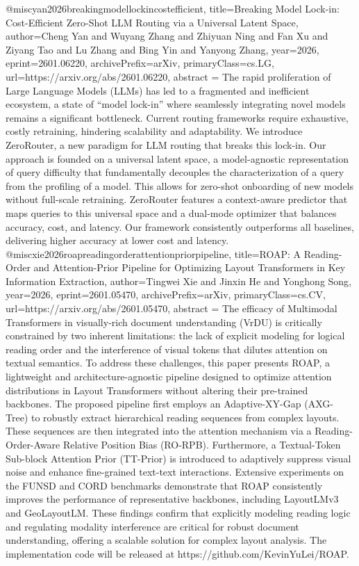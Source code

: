{}@misc{yan2026breakingmodellockincostefficient,
      title={Breaking Model Lock-in: Cost-Efficient Zero-Shot LLM Routing via a Universal Latent Space}, 
      author={Cheng Yan and Wuyang Zhang and Zhiyuan Ning and Fan Xu and Ziyang Tao and Lu Zhang and Bing Yin and Yanyong Zhang},
      year={2026},
      eprint={2601.06220},
      archivePrefix={arXiv},
      primaryClass={cs.LG},
      url={https://arxiv.org/abs/2601.06220},
      abstract = {The rapid proliferation of Large Language Models (LLMs) has led to a fragmented and inefficient ecosystem, a state of ``model lock-in'' where seamlessly integrating novel models remains a significant bottleneck. Current routing frameworks require exhaustive, costly retraining, hindering scalability and adaptability. We introduce ZeroRouter, a new paradigm for LLM routing that breaks this lock-in. Our approach is founded on a universal latent space, a model-agnostic representation of query difficulty that fundamentally decouples the characterization of a query from the profiling of a model. This allows for zero-shot onboarding of new models without full-scale retraining. ZeroRouter features a context-aware predictor that maps queries to this universal space and a dual-mode optimizer that balances accuracy, cost, and latency. Our framework consistently outperforms all baselines, delivering higher accuracy at lower cost and latency.}
}@misc{xie2026roapreadingorderattentionpriorpipeline,
      title={ROAP: A Reading-Order and Attention-Prior Pipeline for Optimizing Layout Transformers in Key Information Extraction}, 
      author={Tingwei Xie and Jinxin He and Yonghong Song},
      year={2026},
      eprint={2601.05470},
      archivePrefix={arXiv},
      primaryClass={cs.CV},
      url={https://arxiv.org/abs/2601.05470},
      abstract = {The efficacy of Multimodal Transformers in visually-rich document understanding (VrDU) is critically constrained by two inherent limitations: the lack of explicit modeling for logical reading order and the interference of visual tokens that dilutes attention on textual semantics.   To address these challenges, this paper presents ROAP, a lightweight and architecture-agnostic pipeline designed to optimize attention distributions in Layout Transformers without altering their pre-trained backbones.   The proposed pipeline first employs an Adaptive-XY-Gap (AXG-Tree) to robustly extract hierarchical reading sequences from complex layouts. These sequences are then integrated into the attention mechanism via a Reading-Order-Aware Relative Position Bias (RO-RPB). Furthermore, a Textual-Token Sub-block Attention Prior (TT-Prior) is introduced to adaptively suppress visual noise and enhance fine-grained text-text interactions.   Extensive experiments on the FUNSD and CORD benchmarks demonstrate that ROAP consistently improves the performance of representative backbones, including LayoutLMv3 and GeoLayoutLM.   These findings confirm that explicitly modeling reading logic and regulating modality interference are critical for robust document understanding, offering a scalable solution for complex layout analysis. The implementation code will be released at https://github.com/KevinYuLei/ROAP.}
}
